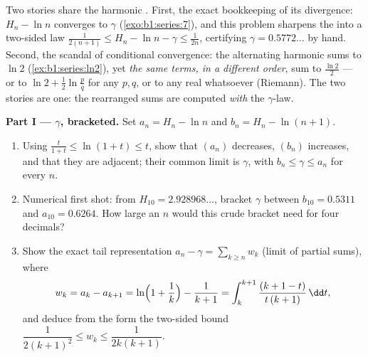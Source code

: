 \begin{problem}[{Weekend problem --- $H_n = \ln n + \gamma +
\frac{1}{2n} + O(n^{-2})$, and rearranging $1 - \frac12 +
\frac13 - \dots$ to $\frac{\ln 2}{2}$}]
\label{pb:b1:series:1}
Two stories share the harmonic . First, the exact
bookkeeping of its divergence: $H_n - \ln n$ converges to  $\gamma$ (\cref{exo:b1:series:7}), and this problem
sharpens the  into a two-sided law $\frac{1}{2(n+1)}
\leq H_n - \ln n - \gamma \leq \frac{1}{2n}$, certifying $\gamma
= 0.5772\dots$ by hand. Second, the scandal of conditional
convergence: the alternating harmonic  sums to $\ln 2$
(\cref{ex:b1:series:ln2}), yet \emph{the same terms, in a
different order}, sum to $\frac{\ln 2}{2}$ --- or to $\ln 2 +
\frac12\ln\frac pq$ for any $p, q$, or to any real whatsoever
(Riemann). The two stories are one: the rearranged sums are
computed \emph{with} the $\gamma$-law.

\medskip
\noindent\textbf{Part I --- $\gamma$, bracketed.} Set $a_n = H_n
- \ln n$ and $b_n = H_n - \ln(n+1)$.
\begin{enumerate}
  \item Using $\frac{t}{1+t} \leq \ln(1 + t) \leq t$, show that
        $(a_n)$ decreases, $(b_n)$ increases, and that they are
        adjacent; their common limit is $\gamma$, with $b_n \leq
        \gamma \leq a_n$ for every $n$.
  \item Numerical first shot: from $H_{10} = 2.928968\dots$,
        bracket $\gamma$ between $b_{10} = 0.5311$ and $a_{10} =
        0.6264$. How large an $n$ would this crude bracket need
        for four decimals?
  \item Show the exact tail representation $a_n - \gamma =
        \sum_{k \geq n} w_k$ (limit of partial sums), where
        \[
        w_k = a_k - a_{k+1}
        = \ln\Bigl(1 + \frac1k\Bigr) - \frac{1}{k+1}
        = \int_k^{k+1} \frac{(k + 1 - t)}{t\,(k+1)}\,\dd t ,
        \]
        and deduce from the  form the two-sided bound
        $\dfrac{1}{2(k+1)^2} \leq w_k \leq \dfrac{1}{2k(k+1)}$.
\end{enumerate}


\end{problem}
